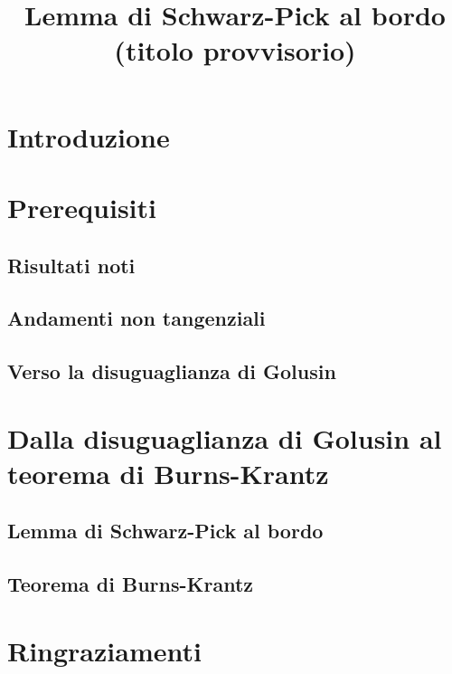 \documentclass{article}
\title{Lemma di Schwarz-Pick al bordo (titolo provvisorio)}
\date{}
\author{}
\begin{document}
\maketitle
\newpage
\tableofcontents
\newpage


\section*{Introduzione}


\newpage

\section{Prerequisiti}

\subsection{Risultati noti}


\subsection{Andamenti non tangenziali}


\subsection{Verso la disuguaglianza di Golusin}


\newpage

\section{Dalla disuguaglianza di Golusin al teorema di Burns-Krantz}

\subsection{Lemma di Schwarz-Pick al bordo}


\subsection{Teorema di Burns-Krantz}


\newpage



\section*{Ringraziamenti}

\end{document}
